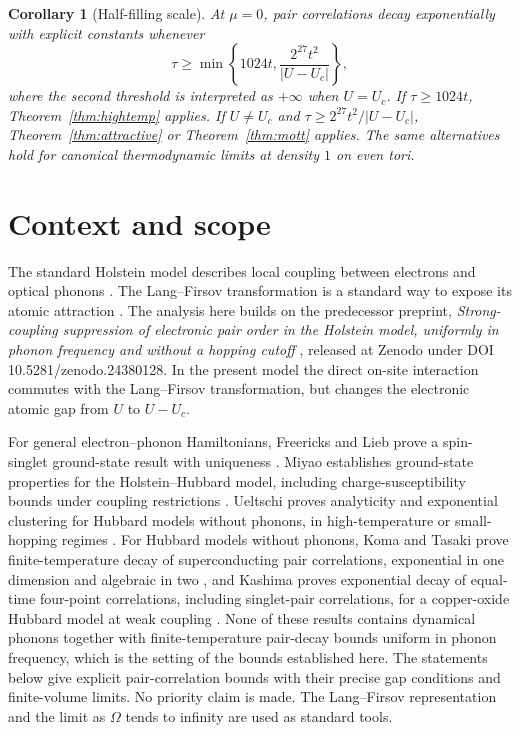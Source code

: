\documentclass[11pt]{article}
\newtheorem{corollary}{Corollary}
\begin{document}
\begin{corollary}[Half-filling scale]\label{cor:half}
At $\mu=0$, pair correlations decay exponentially with explicit constants whenever
\[
 \tau\ge\min\left\{1024t,\frac{2^{27}t^2}{|U-U_c|}\right\},
\]
where the second threshold is interpreted as $+\infty$ when $U=U_c$. If $\tau\ge1024t$, Theorem~\ref{thm:hightemp} applies. If $U\ne U_c$ and $\tau\ge2^{27}t^2/|U-U_c|$, Theorem~\ref{thm:attractive} or Theorem~\ref{thm:mott} applies. The same alternatives hold for canonical thermodynamic limits at density $1$ on even tori.
\end{corollary}

\section{Context and scope}

The standard Holstein model describes local coupling between electrons and optical phonons \cite{holstein}. The Lang–Firsov transformation is a standard way to expose its atomic attraction \cite{langfirsov}. The analysis here builds on the predecessor preprint, \emph{Strong-coupling suppression of electronic pair order in the Holstein model, uniformly in phonon frequency and without a hopping cutoff} \cite{stage6}, released at Zenodo under DOI 10.5281/zenodo.24380128. In the present model the direct on-site interaction commutes with the Lang–Firsov transformation, but changes the electronic atomic gap from $U$ to $U-U_c$.

For general electron–phonon Hamiltonians, Freericks and Lieb prove a spin-singlet ground-state result with uniqueness \cite{freericksLieb}. %
Miyao establishes ground-state properties for the Holstein–Hubbard model, including charge-susceptibility bounds under coupling restrictions \cite{miyao2017}. %
Ueltschi proves analyticity and exponential clustering for Hubbard models without phonons, in high-temperature or small-hopping regimes \cite{uelschiHubbard}. %
For Hubbard models without phonons, Koma and Tasaki prove finite-temperature decay of superconducting pair correlations, exponential in one dimension and algebraic in two \cite{komaTasaki}, and Kashima proves exponential decay of equal-time four-point correlations, including singlet-pair correlations, for a copper-oxide Hubbard model at weak coupling \cite{kashima2014}. %
None of these results contains dynamical phonons together with finite-temperature pair-decay bounds uniform in phonon frequency, which is the setting of the bounds established here. The statements below give explicit pair-correlation bounds with their precise gap conditions and finite-volume limits. No priority claim is made. The Lang–Firsov representation and the limit as $\Omega$ tends to infinity are used as standard tools.
\end{document}
